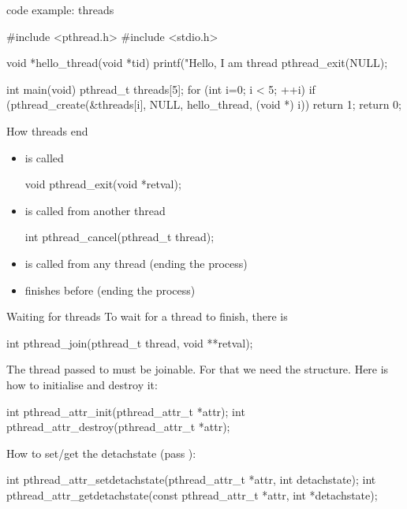 \documentclass[10pt,graphics,aspectratio=169,table]{beamer}
\begin{document}
\begin{frame}[fragile]{code example: threads}
    \begin{codeblock}
#include <pthread.h>
#include <stdio.h>

void *hello_thread(void *tid) {
    printf("Hello, I am thread %
    pthread_exit(NULL);
}

int main(void) {
    pthread_t threads[5];
    for (int i=0; i < 5; ++i) {
       if (pthread_create(&threads[i], NULL,
                          hello_thread, (void *) i))
          return 1;
    }
    return 0;
}

\end{codeblock}
\end{frame}
\begin{frame}[fragile]{How threads end}
    \begin{itemize}
        \item {} is called
        \begin{codeblock}
void pthread_exit(void *retval);
\end{codeblock}
        \item {} is called from another thread
        \begin{codeblock}
int pthread_cancel(pthread_t thread);
\end{codeblock}
        \item {} is called from any thread (ending the process)
        \item {} finishes before  (ending the process)
    \end{itemize}
\end{frame}
\begin{frame}[fragile]{Waiting for threads}
    To wait for a thread to finish, there is 
    \begin{codeblock}
int pthread_join(pthread_t thread, void **retval);
\end{codeblock}
    \bigskip
    The thread passed to  must be joinable. For that we need the
     structure. Here is how to initialise and destroy it:\\
        \begin{codeblock}
int pthread_attr_init(pthread_attr_t *attr);
int pthread_attr_destroy(pthread_attr_t *attr);
\end{codeblock}
    \bigskip
    How to set/get the detachstate (pass ):
    \begin{codeblock}
int pthread_attr_setdetachstate(pthread_attr_t *attr,
                                int detachstate);
int pthread_attr_getdetachstate(const pthread_attr_t *attr,
                                int *detachstate);
\end{codeblock}
\end{frame}
\end{document}
